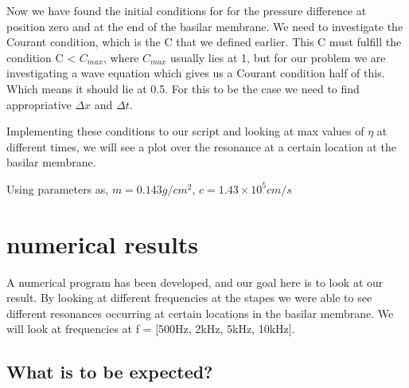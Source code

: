 \documentclass[twoside,twocolumn]{article}
\begin{document}
\bigskip

 Now we have found the initial conditions for for the pressure difference at position zero and at the end of the basilar membrane. We need to investigate the Courant condition, which is the C that we defined earlier. This C must fulfill the condition C < $C_{max}$, where $C_{max}$ usually lies at 1, but for our problem we are investigating a wave equation which gives us a Courant condition half of this. Which means it should lie at 0.5. For this to be the case we need to find appropriative $\Delta x$ and $\Delta t$.
 
 Implementing these conditions to our script and looking at max values of $\eta$ at different times, we will see a plot over the resonance at a certain location at the basilar membrane. 

Using parameters as, $m = 0.143g/cm^2$, $c = 1.43 \times 10^5 cm/s$


\section{numerical results}

A numerical program has been developed, and our goal here is to look at our result. By looking at different frequencies at the stapes we were able to see different resonances occurring at certain locations in the basilar membrane. We will look at frequencies at f = [500Hz, 2kHz, 5kHz, 10kHz].

\subsection{What is to be expected?}
\end{document}
